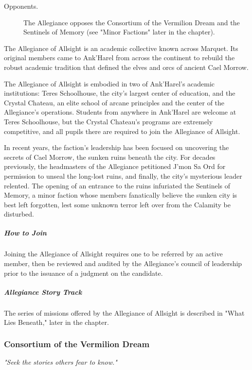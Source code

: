 \documentclass[10pt,a4paper,twoside,bg=print,twocolumn,openany,nodeprecatedcode]{dndbook}
\begin{document}
\begin{description}
\item[Opponents.]
The Allegiance opposes the Consortium of the Vermilion Dream and the Sentinels of Memory (see "Minor Factions" later in the chapter).
\end{description}

The Allegiance of Allsight is an academic collective known across Marquet. Its original members came to Ank'Harel from across the continent to rebuild the robust academic tradition that defined the elves and orcs of ancient Cael Morrow.

The Allegiance of Allsight is embodied in two of Ank'Harel's academic institutions: Teres Schoolhouse, the city's largest center of education, and the Crystal Chateau, an elite school of arcane principles and the center of the Allegiance's operations. Students from anywhere in Ank'Harel are welcome at Teres Schoolhouse, but the Crystal Chateau's programs are extremely competitive, and all pupils there are required to join the Allegiance of Allsight.

In recent years, the faction's leadership has been focused on uncovering the secrets of Cael Morrow, the sunken ruins beneath the city. For decades previously, the headmasters of the Allegiance petitioned J'mon Sa Ord for permission to unseal the long-lost ruins, and finally, the city's mysterious leader relented. The opening of an entrance to the ruins infuriated the Sentinels of Memory, a minor faction whose members fanatically believe the sunken city is best left forgotten, lest some unknown terror left over from the Calamity be disturbed.

\subparagraph{How to Join}
Joining the Allegiance of Allsight requires one to be referred by an active member, then be reviewed and audited by the Allegiance's council of leadership prior to the issuance of a judgment on the candidate.

\subparagraph{Allegiance Story Track}
The series of missions offered by the Allegiance of Allsight is described in "What Lies Beneath," later in the chapter.

\subsubsection{Consortium of the Vermilion Dream}
\textit{"Seek the stories others fear to know."}
\end{document}
